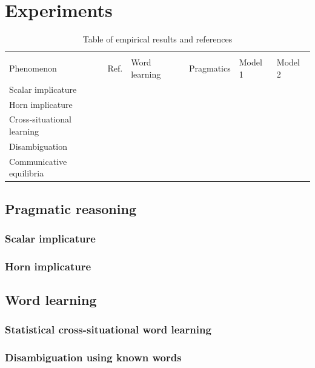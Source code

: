 \documentclass{article} %
\begin{document}
\section{Experiments}

\begin{table}[t]
\caption{Table of empirical results and references}
\label{tab:results}
\begin{center}
\begin{tabular}{llllll}
\hline \\
Phenomenon & Ref. & Word learning \cite{frank2009} & Pragmatics \cite{frank2012,bergen2012}  & Model 1 & Model 2 \\
\hline
Scalar implicature & \cite{stiller2011} & & & & \\
Horn implicature & & & & & \\
Cross-situational learning & \cite{yu2007} & & & & \\
Disambiguation & \cite{markman1988} & & & & \\
Communicative equilibria & \cite{galantucci2007} & & & & \\
\end{tabular}
\end{center}
\end{table}

\subsection{Pragmatic reasoning}

\subsubsection{Scalar implicature}

\subsubsection{Horn implicature}

\subsection{Word learning}

\subsubsection{Statistical cross-situational word learning}

\subsubsection{Disambiguation using known words}
\end{document}
